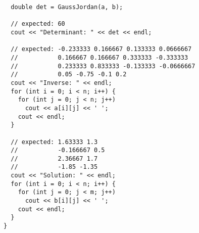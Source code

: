 \begin{lstlisting}
  double det = GaussJordan(a, b);
  
  // expected: 60  
  cout << "Determinant: " << det << endl;

  // expected: -0.233333 0.166667 0.133333 0.0666667
  //           0.166667 0.166667 0.333333 -0.333333
  //           0.233333 0.833333 -0.133333 -0.0666667
  //           0.05 -0.75 -0.1 0.2
  cout << "Inverse: " << endl;
  for (int i = 0; i < n; i++) {
    for (int j = 0; j < n; j++)
      cout << a[i][j] << ' ';
    cout << endl;
  }
  
  // expected: 1.63333 1.3
  //           -0.166667 0.5
  //           2.36667 1.7
  //           -1.85 -1.35
  cout << "Solution: " << endl;
  for (int i = 0; i < n; i++) {
    for (int j = 0; j < m; j++)
      cout << b[i][j] << ' ';
    cout << endl;
  }
}
\end{lstlisting}
